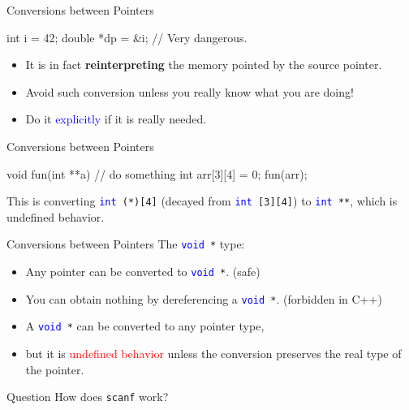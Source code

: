 \documentclass{beamer}
\newcommand{\red}[1]{\textcolor{red}{#1}}
\newcommand{\blue}[1]{\textcolor{blue}{#1}}
\newcommand{\ttt}[1]{\texttt{#1}}
\newcommand{\bluett}[1]{\blue{\ttt{#1}}}
\newenvironment{question}{\begin{alertblock}{Question}}{\end{alertblock}}
\theoremstyle{definition}
\begin{document}
\begin{frame}[fragile]{Conversions between Pointers}
    \begin{cpp}
int i = 42;
double *dp = &i; // Very dangerous.
    \end{cpp}
    \begin{itemize}
        \item It is in fact \textbf{reinterpreting} the memory pointed by the source pointer.
        \item Avoid such conversion unless you really know what you are doing!
        \item Do it \blue{explicitly} if it is really needed.
    \end{itemize}
\end{frame}

\begin{frame}[fragile]{Conversions between Pointers}
    \begin{cpp}
void fun(int **a) {
  // do something
}
int arr[3][4] = {0};
fun(arr);
    \end{cpp}
    This is converting \bluett{int }\ttt{(*)[4]} (decayed from \bluett{int }\ttt{[3][4]}) to \bluett{int }\ttt{**}, which is undefined behavior.
\end{frame}

\begin{frame}{Conversions between Pointers}
    The \bluett{void }\ttt{*} type:
    \begin{itemize}
        \item Any pointer can be converted to \bluett{void }\ttt{*}. (safe)
        \item You can obtain nothing by dereferencing a \bluett{void }\ttt{*}. (forbidden in C++)
        \pause
        \item A \bluett{void }\ttt{*} can be converted to any pointer type,
        \item but it is \red{undefined behavior} unless the conversion preserves the real type of the pointer.
    \end{itemize}
    \pause
    \begin{question}
        How does \ttt{scanf} work?
    \end{question}
\end{frame}
\end{document}
